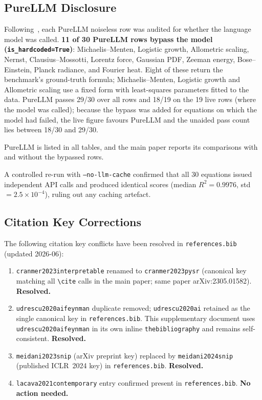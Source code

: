 \documentclass[twoside,11pt]{article}
\begin{document}
\subsection*{PureLLM Disclosure}

Following~\citet{memorization2024audit}, each PureLLM noiseless row was audited for whether the
language model was called. \textbf{11 of 30 PureLLM rows bypass the model
(\texttt{is\_hardcoded=True})}: Michaelis--Menten, Logistic growth,
Allometric scaling, Nernst, Clausius--Mossotti, Lorentz force, Gaussian PDF,
Zeeman energy, Bose--Einstein, Planck radiance, and Fourier heat. Eight of these
return the benchmark's ground-truth formula; Michaelis--Menten, Logistic growth and Allometric scaling use a fixed form with
least-squares parameters fitted to the data. PureLLM passes 29/30 over all rows and 18/19 on the 19 live rows
(where the model was called); because the bypass was added for equations on which the model had failed,
the live figure favours PureLLM and the unaided pass count lies between 18/30 and 29/30.

PureLLM is listed in all tables, and the main paper reports its comparisons with and without the bypassed rows.

A controlled re-run with \texttt{--no-llm-cache} confirmed that all
30 equations issued independent API calls and produced identical scores
(median $R^2=0.9976$, std $=2.5\times10^{-4}$), ruling out any
caching artefact.

\subsection*{Citation Key Corrections}

The following citation key conflicts have been resolved in \texttt{references.bib}
(updated 2026-06):

\begin{enumerate}
  \item \texttt{cranmer2023interpretable} renamed to \texttt{cranmer2023pysr}
        (canonical key matching all \texttt{\textbackslash cite} calls in the main paper;
        same paper arXiv:2305.01582). \textbf{Resolved.}
  \item \texttt{udrescu2020aifeynman} duplicate removed; \texttt{udrescu2020ai}
        retained as the single canonical key in \texttt{references.bib}.
        This supplementary document uses \texttt{udrescu2020aifeynman} in its own
        inline \texttt{thebibliography} and remains self-consistent. \textbf{Resolved.}
  \item \texttt{meidani2023snip} (arXiv preprint key) replaced by
        \texttt{meidani2024snip} (published ICLR~2024 key) in
        \texttt{references.bib}. \textbf{Resolved.}
  \item \texttt{lacava2021contemporary} entry confirmed present in
        \texttt{references.bib}. \textbf{No action needed.}
\end{enumerate}
\end{document}
